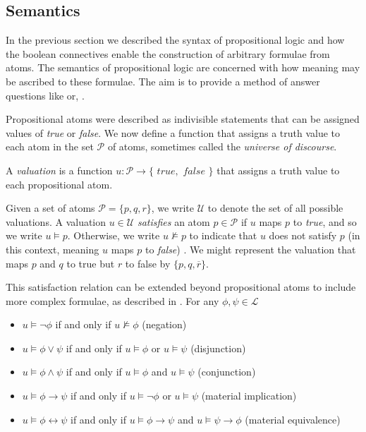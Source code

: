 \subsection{Semantics}
\label{subsection:semantics}  In the previous section we described the syntax of
propositional logic and how the boolean connectives enable the construction of arbitrary formulae from atoms. The semantics
of propositional logic are concerned with how meaning may be ascribed to these formulae. The aim is to provide a method
of answer questions like  or, .

Propositional atoms were described as indivisible statements that can be assigned values of \textit{true} or \textit{false}.
We now define a function that assigns a truth value to each atom in the set $\mathcal{P}$ of atoms, sometimes called the
\textit{universe of discourse}. 

\begin{definition}
	\label{definition:valuation}  A \textit{valuation} is a function
	$u : \mathcal{P}\to \{\textit{ true}, \textit{ false }\}$ that assigns a truth value to each propositional atom.
\end{definition}

Given a set of atoms $\mathcal{P}= \{p,q,r\}$, we write $\mathcal{U}$ to denote the set of all possible valuations. A valuation
$u \in \mathcal{U}$ \textit{satisfies} an atom $p \in \mathcal{P}$ if $u$ maps $p$ to \textit{true}, and so we write
$u \vDash p$. Otherwise, we write $u \nvDash p$ to indicate that $u$ does not satisfy $p$ (in this context, meaning $u$
maps $p$ to \textit{false}) \cite[p. 16]{Ben1993Mathematical}. We might represent the valuation that maps $p$ and $q$ to
true but $r$ to false by $\{p,q,\overline{r}\}$.

This satisfaction relation can be extended beyond propositional atoms to include more complex formulae, as described in
. For any $\phi, \psi \in \mathcal{L}$ 

\begin{itemize}
	\item $u \vDash \neg \phi$ if and only if $u \nvDash \phi$ \hfill (negation)

	\item $u \vDash \phi \vee \psi$ if and only if $u \vDash \phi$ or $u \vDash \psi$ \hfill (disjunction)

	\item $u \vDash \phi \wedge \psi$ if and only if $u \vDash \phi$ and $u \vDash \psi$ \hfill (conjunction)

	\item $u \vDash \phi \rightarrow \psi$ if and only if $u \vDash \neg \phi$ or $u \vDash \psi$ \hfill (material
		implication)

	\item $u \vDash \phi \leftrightarrow \psi$ if and only if $u \vDash \phi \rightarrow \psi$ and $u \vDash \psi \rightarrow
		\phi$ \hfill (material equivalence)
\end{itemize}

